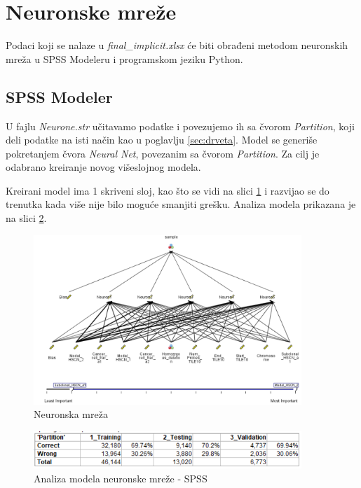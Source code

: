 \documentclass[a4paper]{article}
\begin{document}
\section{Neuronske mreže}
\label{sec:neuron}

Podaci koji se nalaze u \textit{final\_implicit.xlsx} će biti obrađeni metodom neuronskih mreža u SPSS Modeleru i programskom jeziku Python.

\subsection{SPSS Modeler}

U fajlu \textit{Neurone.str} učitavamo podatke i povezujemo ih sa čvorom \textit{Partition}, koji deli podatke na isti način kao u poglavlju \ref{sec:drveta}. Model se generiše pokretanjem čvora \textit{Neural Net}, povezanim sa čvorom \textit{Partition}. Za cilj je odabrano kreiranje novog višeslojnog modela.

Kreirani model ima 1 skriveni sloj, kao što se vidi na slici \ref{fig:neurone} i razvijao se do trenutka kada više nije bilo moguće smanjiti grešku. Analiza modela prikazana je na slici \ref{fig:neurone_an}.
\begin{figure}[ht!]
                \centering
                \includegraphics[width=0.9\textwidth]{Neural_model.PNG}
                \caption{Neuronska mreža}
                \label{fig:neurone}
            \end{figure}
            
            \begin{figure}[ht!]
                \centering
                \includegraphics[width=0.9\textwidth]{Neural_analysis.PNG}
                \caption{Analiza modela neuronske mreže - SPSS}
                \label{fig:neurone_an}
            \end{figure}
\end{document}
